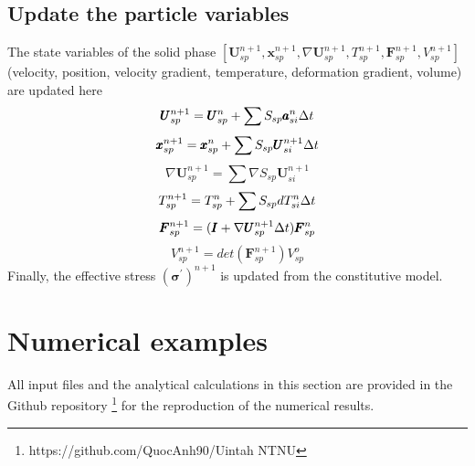 \documentclass[preprint,12pt]{elsarticle}
\begin{document}
\subsection{\textsf{Update the particle variables}}
%
%
The state variables of the solid phase $[\pmb{U}_{sp}^{n+1},\pmb{x}_{sp}^{n+1},\nabla \pmb{U}_{sp}^{n+1}, T_{sp}^{n+1}, \pmb{F}_{sp}^{n+1},V_{sp}^{n+1}]$ (velocity, position, velocity gradient, temperature, deformation gradient, volume) are updated here 
%
%
\begin{equation}
     \pmb{U}_{sp}^{n+1} = \pmb{U}_{sp}^n + \sum{S_{sp} \pmb{a}_{si}^n \ensuremath{\Delta{t}} } 
\end{equation}
%
%
\begin{equation}
     \pmb{x}_{sp}^{n+1} = \pmb{x}_{sp}^n + \sum{S_{sp} \pmb{U}_{si}^{n+1} \ensuremath{\Delta{t}} } 
\end{equation}
%
%
\begin{equation}
    \nabla \pmb{U}_{sp}^{n+1} = \sum{\nabla S_{sp} \pmb{U}_{si}^{n+1}} 
\end{equation}
%
%
\begin{equation}
     T_{sp}^{n+1} = T_{sp}^n + \sum{S_{sp} dT_{si}^n \ensuremath{\Delta{t}} } 
\end{equation}
%
%
\begin{equation}
     \pmb{F}_{sp}^{n+1} = (\pmb{I} + \nabla \pmb{U}_{sp}^{n+1} \Delta{t})\pmb{F}_{sp}^n
\end{equation}
%
%
\begin{equation}
     V_{sp}^{n+1} = det(\pmb{F}_{sp}^{n+1}) V_{sp}^o
\end{equation}
%
%
Finally, the effective stress $(\pmb{\sigma}^\prime)^{n+1}$ is updated from the constitutive model.
\section{\textsf{Numerical examples}}
All input files and the analytical calculations in this section are provided in the Github repository \footnote{https://github.com/QuocAnh90/Uintah NTNU} for the reproduction of the numerical results.\\
\end{document}
